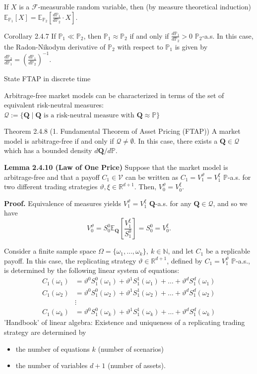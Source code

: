 If \(X\) is a \(\mathcal{F}\)-measurable random variable, then (by measure theoretical induction)
\(
\mathbb{E}_{\mathbb{P}_1}[X] = \mathbb{E}_{\mathbb{P}_2}\left[ \frac{d\mathbb{P}_1}{d\mathbb{P}_2} \cdot X \right].
\)

Corollary 2.4.7
If \(\mathbb{P}_1 \ll \mathbb{P}_2\), then \(\mathbb{P}_1 \approx \mathbb{P}_2\) if and only if 
\(\frac{d\mathbb{P}_1}{d\mathbb{P}_2} > 0\) \(\mathbb{P}_2\)-a.s. 
In this case, the Radon-Nikodym derivative of \(\mathbb{P}_2\) with respect to \(\mathbb{P}_1\) is given by
\(
\frac{d\mathbb{P}_2}{d\mathbb{P}_1} = \left( \frac{d\mathbb{P}_1}{d\mathbb{P}_2} \right)^{-1}.
\)

State FTAP in discrete time

Arbitrage-free market models can be characterized in terms of the set of equivalent risk-neutral measures:
\(
\mathcal{Q} := \{ \mathbf{Q} \mid \mathbf{Q} \text{ is a risk-neutral measure with } \mathbf{Q} \approx \mathbb{P} \}
\)

Theorem 2.4.8 (1. Fundamental Theorem of Asset Pricing (FTAP))
A market model is arbitrage-free if and only if \(\mathcal{Q} \neq \emptyset\). 
In this case, there exists a \(\mathbf{Q} \in \mathcal{Q}\) which has a bounded density \(d\mathbf{Q}/d\mathbb{P}\).


\textbf{Lemma 2.4.10 (Law of One Price)}
Suppose that the market model is arbitrage-free and that a payoff \(C_1 \in \mathcal{V}\) can be written as \(C_1 = V_1^\vartheta = V_1^\xi\) \(\mathbb{P}\)-a.s. for two different trading strategies \(\vartheta, \xi \in \mathbb{R}^{d+1}\). Then, \(V_0^\vartheta = V_0^\xi\).

\textbf{Proof.}
Equivalence of measures yields \(V_1^\vartheta = V_1^\xi\) \(\mathbf{Q}\)-a.s. for any \(\mathbf{Q} \in \mathcal{Q}\), and so we have
\[
V_0^\vartheta = S_0^0 \mathbb{E}_\mathbf{Q} \left[ \frac{V_1^\xi}{S_1^0} \right] = S_0^0 = V_0^\xi.
\]

Consider a finite sample space \(\Omega = \{\omega_1, \ldots, \omega_k\}, \ k \in \mathbb{N}\), and let \(C_1\) be a replicable payoff.
In this case, the replicating strategy \(\vartheta \in \mathbb{R}^{d+1}\), defined by \(C_1 = V_1^\vartheta\) \(\mathbb{P}\)-a.s., is determined by the following linear system of equations:
\[
\begin{align*}
C_1(\omega_1) &= \vartheta^0 S_1^0(\omega_1) + \vartheta^1 S_1^1(\omega_1) + \ldots + \vartheta^d S_1^d(\omega_1) \\
C_1(\omega_2) &= \vartheta^0 S_1^0(\omega_2) + \vartheta^1 S_1^1(\omega_2) + \ldots + \vartheta^d S_1^d(\omega_2) \\
&\vdots \\
C_1(\omega_k) &= \vartheta^0 S_1^0(\omega_k) + \vartheta^1 S_1^1(\omega_k) + \ldots + \vartheta^d S_1^d(\omega_k)
\end{align*}
\]
'Handbook' of linear algebra: Existence and uniqueness of a replicating trading strategy are determined by
\begin{itemize}
    \item the number of equations \(k\) (number of scenarios)
    \item the number of variables \(d + 1\) (number of assets).
\end{itemize}


